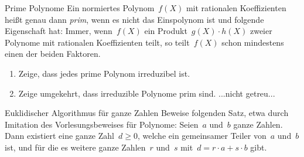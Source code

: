 \documentclass{algblatt}
\begin{document}
\begin{aufgabe}{Prime Polynome}
Ein normiertes Polynom~$f(X)$ mit rationalen Koeffizienten heißt genau
dann \emph{prim}, wenn es nicht das Einspolynom ist und folgende Eigenschaft
hat: Immer, wenn~$f(X)$ ein Produkt~$g(X) \cdot h(X)$ zweier Polynome mit
rationalen Koeffizienten teilt, so teilt~$f(X)$ schon mindestens einen der
beiden Faktoren.
\begin{enumerate}
\item Zeige, dass jedes prime Polynom irreduzibel ist.
\item Zeige umgekehrt, dass irreduzible Polynome prim sind.
...nicht getreu...
\end{enumerate}
\end{aufgabe}

\begin{aufgabe}{Euklidischer Algorithmus für ganze Zahlen}
Beweise folgenden Satz, etwa durch Imitation des Vorlesungsbeweises für
Polynome: Seien~$a$ und~$b$ ganze Zahlen. Dann existiert eine ganze Zahl~$d
\geq 0$, welche ein gemeinsamer Teiler von~$a$ und~$b$ ist, und für die es
weitere ganze Zahlen~$r$ und~$s$ mit~$d = r \cdot a + s \cdot b$ gibt.
\end{aufgabe}
 
\end{document}
